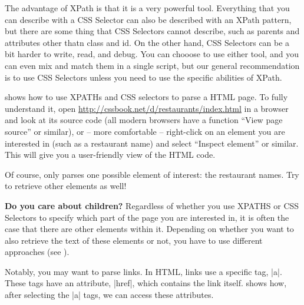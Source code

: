 The advantage of XPath is that it is a very powerful tool. 
Everything that you can describe with a CSS Selector can also be described with an XPath pattern,
but there are some thing that CSS Selectors cannot describe,
such as parents and attributes other thatn class and id.
On the other hand, CSS Selectors can be a bit harder to write, read, and debug.
You can chooose to use either tool, and you can even mix and match them in a single script,
but our general recommendation is to use CSS Selectors unless you need to use the specific abilities of XPath. 

 shows how to use XPATHs and CSS selectors to parse
a HTML page. To fully understand it, open
\url{http://cssbook.net/d/restaurants/index.html} in a browser and
look at its source code (all modern browsers have a function ``View
page source'' or similar), or -- more comfortable -- right-click on an
element you are interested in (such as a restaurant name) and select
``Inspect element'' or similar. This will give you a user-friendly
view of the HTML code.



Of course,  only parses one possible element of interest: the restaurant names. Try to retrieve other elements as well!

\begin{feature}\textbf{Do you care about children?}
Regardless of whether you use XPATHS or CSS Selectors to specify which part of the page you are interested in, it is often the case that there are other elements within it. Depending on whether you want to also retrieve the text of these elements or not, you have to use different approaches (see ).
\end{feature}



Notably, you may want to parse links. In HTML, links use a specific tag, |a|. These tags have an attribute, |href|, which contains the link itself.  shows how, after selecting the |a| tags, we can access these attributes. 




